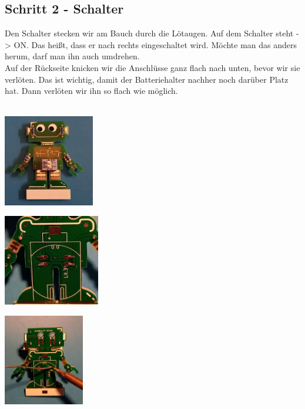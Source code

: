 \documentclass[a4paper]{article}
\begin{document}
\subsection{Schritt 2 - Schalter}
Den Schalter stecken wir am Bauch durch die Lötaugen. Auf dem Schalter steht -> ON. Das heißt, dass er nach rechts eingeschaltet wird. Möchte man das anders herum, darf man ihn auch umdrehen.\\
Auf der Rückseite knicken wir die Anschlüsse ganz flach nach unten, bevor wir sie verlöten. Das ist wichtig, damit der Batteriehalter nachher noch darüber Platz hat. Dann verlöten wir ihn so flach wie möglich.\\ \ \\
\begin{minipage}[t]{0.33\textwidth}
  \centering
  \includegraphics[height=4cm]{../pictures/Switch1.jpg}
  \label{img:Switch1}
  \end{minipage}
\begin{minipage}[t]{0.33\textwidth}
  \centering
  \includegraphics[height=4cm]{../pictures/Switch2.jpg}
  \label{img:Switch2}
\end{minipage}
\begin{minipage}[t]{0.33\textwidth}
  \centering
  \includegraphics[height=4cm]{../pictures/Switch3.jpg}
  \label{img:Switch3}
\end{minipage}
\end{document}
